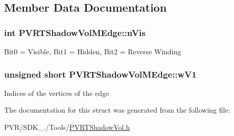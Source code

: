 \subsection{Member Data Documentation}
\hypertarget{struct_p_v_r_t_shadow_vol_m_edge_ad23fb467a77250672d033523cac402e9}{
\subsubsection[{n\+Vis}]{\setlength{\rightskip}{0pt plus 5cm}int P\+V\+R\+T\+Shadow\+Vol\+M\+Edge\+::n\+Vis}}\label{struct_p_v_r_t_shadow_vol_m_edge_ad23fb467a77250672d033523cac402e9}
Bit0 = Visible, Bit1 = Hidden, Bit2 = Reverse Winding \hypertarget{struct_p_v_r_t_shadow_vol_m_edge_a8dc997a06be70b865f762bff1229b18a}{
\subsubsection[{w\+V1}]{\setlength{\rightskip}{0pt plus 5cm}unsigned short P\+V\+R\+T\+Shadow\+Vol\+M\+Edge\+::w\+V1}}\label{struct_p_v_r_t_shadow_vol_m_edge_a8dc997a06be70b865f762bff1229b18a}
Indices of the vertices of the edge 

The documentation for this struct was generated from the following file\+:\begin{DoxyCompactItemize}
\item 
P\+V\+R/\+S\+D\+K\+\_./\+Tools/\hyperlink{_p_v_r_t_shadow_vol_8h}{P\+V\+R\+T\+Shadow\+Vol.\+h}\end{DoxyCompactItemize}
